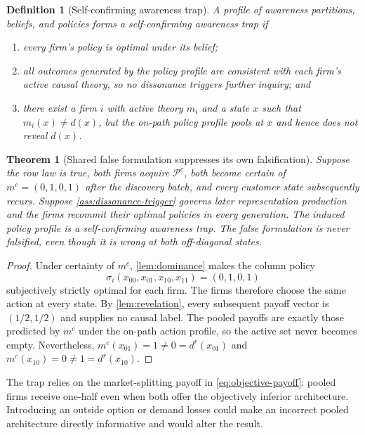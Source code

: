 \documentclass[11pt]{article}
\newtheorem{definition}[assumption]{Definition}
\newtheorem{theorem}[assumption]{Theorem}
\newcommand{\Pcol}{\mathcal P^{c}}
\begin{document}
\begin{definition}[Self-confirming awareness trap]
\label{def:awareness-trap}
A profile of awareness partitions, beliefs, and policies forms a
self-confirming awareness trap if
\begin{enumerate}[label=(\roman*)]
  \item every firm's policy is optimal under its belief;
  \item all outcomes generated by the policy profile are consistent with each
  firm's active causal theory, so no dissonance triggers further inquiry; and
  \item there exist a firm $i$ with active theory $m_i$ and a state $x$ such
  that $m_i(x)\neq d(x)$, but the on-path policy profile pools at $x$ and hence
  does not reveal $d(x)$.
\end{enumerate}
\end{definition}

\begin{theorem}[Shared false formulation suppresses its own falsification]
\label{thm:self-confirming-trap}
Suppose the row law is true, both firms acquire $\Pcol$, both become certain of
$m^c=(0,1,0,1)$ after the discovery batch, and every customer state subsequently
recurs.  Suppose \cref{ass:dissonance-trigger} governs later representation
production and the firms recommit their optimal policies in every generation.
The induced policy profile is a self-confirming awareness trap.
The false formulation is never falsified, even though it is wrong at both
off-diagonal states.
\end{theorem}

\begin{proof}
Under certainty of $m^c$, \cref{lem:dominance} makes the column policy
\[
\sigma_i(x_{00},x_{01},x_{10},x_{11})=(0,1,0,1)
\]
subjectively strictly optimal for each firm.  The firms therefore choose the
same action at every state.  By \cref{lem:revelation}, every subsequent payoff
vector is $(1/2,1/2)$ and supplies no causal label.  The pooled payoffs are
exactly those predicted by $m^c$ under the on-path action profile, so the active
set never becomes empty.  Nevertheless, $m^c(x_{01})=1\neq0=d^r(x_{01})$ and
$m^c(x_{10})=0\neq1=d^r(x_{10})$.
\end{proof}

The trap relies on the market-splitting payoff in \cref{eq:objective-payoff}:
pooled firms receive one-half even when both offer the objectively inferior
architecture.  Introducing an outside option or demand losses could make an
incorrect pooled architecture directly informative and would alter the result.
\end{document}
